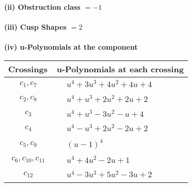 \documentclass[1p]{elsarticle_modified}
\theoremstyle{definition}
\begin{document}
\flushleft \textbf{(ii) Obstruction class $= -1$}\\~\\
\flushleft \textbf{(iii) Cusp Shapes $= 2$}\\~\\
\newpage\renewcommand{\arraystretch}{1}
\flushleft \textbf{(iv) u-Polynomials at the component}\newline \\
\begin{tabular}{m{50pt}|m{274pt}}
Crossings & \hspace{64pt}u-Polynomials at each crossing \\
\hline $$\begin{aligned}c_{1},c_{7}\end{aligned}$$&$\begin{aligned}
&u^4+3 u^3+4 u^2+4 u+4
\end{aligned}$\\
\hline $$\begin{aligned}c_{2},c_{8}\end{aligned}$$&$\begin{aligned}
&u^4+u^3+2 u^2+2 u+2
\end{aligned}$\\
\hline $$\begin{aligned}c_{3}\end{aligned}$$&$\begin{aligned}
&u^4+u^3-3 u^2- u+4
\end{aligned}$\\
\hline $$\begin{aligned}c_{4}\end{aligned}$$&$\begin{aligned}
&u^4- u^3+2 u^2-2 u+2
\end{aligned}$\\
\hline $$\begin{aligned}c_{5},c_{9}\end{aligned}$$&$\begin{aligned}
&(u-1)^4
\end{aligned}$\\
\hline $$\begin{aligned}c_{6},c_{10},c_{11}\end{aligned}$$&$\begin{aligned}
&u^4+4 u^2-2 u+1
\end{aligned}$\\
\hline $$\begin{aligned}c_{12}\end{aligned}$$&$\begin{aligned}
&u^4-3 u^3+5 u^2-3 u+2
\end{aligned}$\\
\hline
\end{tabular}\\~\\
\end{document}
